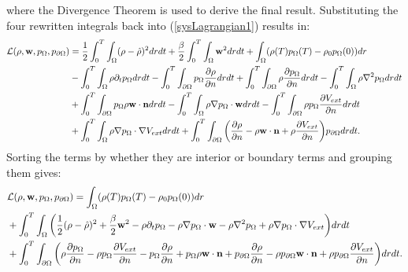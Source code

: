 where the Divergence Theorem is used to derive the final result.
Substituting the four rewritten integrals back into (\ref{sysLagrangian1}) results in:
\begin{align*}
\mathcal{L}(\rho,\mathbf{w}, p_\Omega, p_{\partial \Omega}) &= \frac{1}{2}\int_0^T \int_\Omega  (\rho- \hat{\rho})^2 dr dt+ \frac{\beta}{2}\int_0^T \int_\Omega  \mathbf{w}^2 dr dt   
+ \int_\Omega (\rho(T) p_\Omega(T) -\rho_0 p_\Omega(0))dr \\ \notag 
&- \int_0^T\int_\Omega \rho\partial_t  p_\Omega dr dt - \int_0^T \int_{\partial \Omega}  p_\Omega \frac{\partial \rho}{\partial n} dr dt + \int_0^T \int_{\partial \Omega}  \rho \frac{\partial p_\Omega }{\partial n} dr dt  - \int_0^T \int_\Omega \rho \nabla^2 p_\Omega dr dt  \notag \\
&+ \int_0^T \int_{\partial \Omega} p_\Omega \rho \mathbf{w} \cdot \mathbf{n} dr dt  - \int_0^T \int_\Omega  \rho \nabla p_\Omega \cdot \mathbf{w} dr dt \notag 
- \int_0^T \int_{\partial\Omega}  \rho p_\Omega \frac{\partial V_{ext}}{\partial n} dr dt   \notag \\
& +\int_0^T \int_\Omega  \rho \nabla p_\Omega\cdot \nabla V_{ext} dr dt  + \int_0^T \int_{\partial \Omega}  \bigg(\dfrac{\partial \rho}{\partial n} - \rho \mathbf{w} \cdot \mathbf{n} + \rho \dfrac{\partial V_{ext}}{\partial n}\bigg) p_{\partial \Omega} dr  dt\notag.
\end{align*}
Sorting the terms by whether they are interior or boundary terms and grouping them gives: 
\begin{align} \label{sysLagrangian2}
&\mathcal{L}(\rho,\mathbf{w}, p_\Omega, p_{\partial \Omega}) =\int_\Omega (\rho(T) p_\Omega(T) -\rho_0 p_\Omega(0))dr \\
&+ \int_0^T \int_\Omega \bigg( \frac{1}{2}(\rho- \hat{\rho})^2  + \frac{\beta}{2} \mathbf{w}^2 - \rho\partial_t  p_\Omega  - \rho \nabla p_\Omega \cdot \mathbf{w}   \notag 
- \rho \nabla^2 p_\Omega +  \rho \nabla p_\Omega\cdot \nabla V_{ext} \bigg)dr dt  \\
& + \int_0^T \int_{\partial \Omega}  \bigg( \rho \frac{\partial p_\Omega }{\partial n}  -  \rho p_\Omega \frac{\partial V_{ext}}{\partial n} 
- p_\Omega \frac{\partial \rho}{\partial n} 
+ p_\Omega \rho \mathbf{w} \cdot \mathbf{n} \notag 
+ p_{\partial \Omega} \dfrac{\partial \rho}{\partial n} - \rho p_{\partial \Omega} \mathbf{w} \cdot \mathbf{n} + \rho p_{\partial \Omega} \dfrac{\partial V_{ext}}{\partial n}  \bigg) dr dt  \notag.
\end{align}

